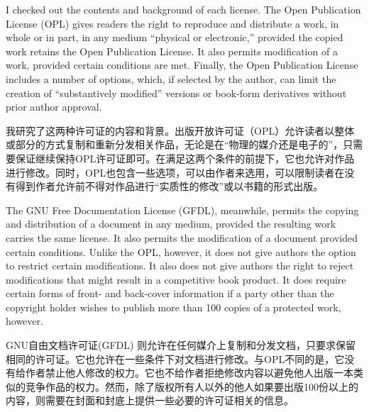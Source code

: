 \ifdefined\eng
I checked out the contents and background of each license. The Open Publication License (OPL) gives readers the right to reproduce and distribute a work, in whole or in part, in any medium ``physical or electronic,'' provided the copied work retains the Open Publication License. It also permits modification of a work, provided certain conditions are met. Finally, the Open Publication License includes a number of options, which, if selected by the author, can limit the creation of ``substantively modified'' versions or book-form derivatives without prior author approval.
\fi

\ifdefined\chs
我研究了这两种许可证的内容和背景。出版开放许可证（OPL）允许读者以整体或部分的方式复制和重新分发相关作品，无论是在``物理的媒介还是电子的''，只需要保证继续保持OPL许可证即可。在满足这两个条件的前提下，它也允许对作品进行修改。同时，OPL也包含一些选项，可以由作者来选用，可以限制读者在没有得到作者允许前不得对作品进行``实质性的修改''或以书籍的形式出版。
\fi

\ifdefined\eng
The GNU Free Documentation License (GFDL),  meanwhile, permits the copying and distribution of a document in any medium, provided the resulting work carries the same license. It also permits the modification of a document provided certain conditions. Unlike the OPL, however, it does not give authors the option to restrict certain modifications. It also does not give authors the right to reject modifications that might result in a competitive book product. It does require certain forms of front- and back-cover information if a party other than the copyright holder wishes to publish more than 100 copies of a protected work, however.
\fi

\ifdefined\chs
GNU自由文档许可证(GFDL) 则允许在任何媒介上复制和分发文档，只要求保留相同的许可证。它也允许在一些条件下对文档进行修改。与OPL不同的是，它没有给作者禁止他人修改的权力。它也不给作者拒绝修改内容以避免他人出版一本类似的竞争作品的权力。然而，除了版权所有人以外的他人如果要出版100份以上的内容，则需要在封面和封底上提供一些必要的许可证相关的信息。
\fi

